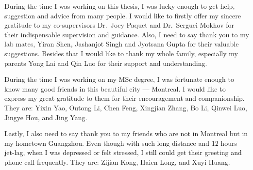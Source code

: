 
\begin{acknowledgments}

During the time I was working on this thesis, I was lucky enough to 
get help, suggestion and advice from many people. I would like to 
firstly offer my sincere gratitude to my co-supervisors Dr.~Joey Paquet 
and Dr.~Serguei Mokhov for their indispensable 
supervision and guidance. 
Also, I need to say thank you to my lab mates, Yiran Shen, Jashanjot 
Singh and Jyotsana Gupta for their valuable suggestions.
Besides that I would like to thank my whole family, especially my parents Yong
Lai and Qin Luo for their support and understanding.

During the time I was working on my MSc degree, I was fortunate enough to 
know many good friends in this beautiful city --- Montreal.
I would like to express my great gratitude to them for their 
encouragement and companionship. They are: Yixin Yao, Outong Li, Chen Feng, 
Xingjian Zhang, Bo Li, Qinwei Luo, Jingye Hou, and Jing Yang.

Lastly, I also need to say thank you to my friends who are not in 
Montreal but in my hometown Guangzhou. Even though with such long distance and
12 hours jet-lag, when I was depressed or felt stressed, I still could
get their greeting and phone call frequently. They are: Zijian Kong,
Haien Long, and Xuyi Huang.

\end{acknowledgments}
